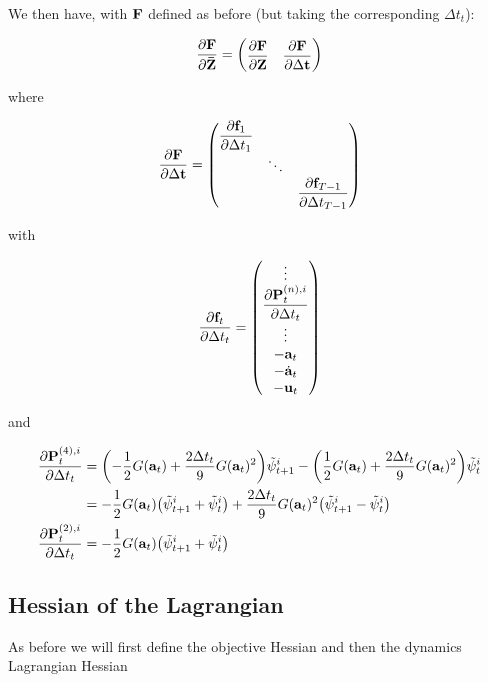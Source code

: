 \documentclass{article}
\newcommand{\isopsi}{\tilde \psi}
\begin{document}
We then have, with $\vb{F}$ defined as before (but taking the corresponding $\Delta t_t$):

\begin{equation}
  \pdv{\vb{F}}{\vb{\bar Z}} = \mqty(
    \displaystyle \pdv{\vb{F}}{\vb{Z}} &  
    \displaystyle \pdv{\vb{F}}{\Delta \vb{t}}
  )
\end{equation}

where 

\begin{equation}
  \pdv{\vb{F}}{\Delta \vb{t}} = \mqty(
    \displaystyle \pdv{\vb{f}_1}{\Delta t_1} \\
    & \ddots \\
    & & \displaystyle \pdv{\vb{f}_{T-1}}{\Delta t_{T-1}}
  )
\end{equation}

with

\begin{equation}
  \pdv{\vb{f}_t}{\Delta t_t} = 
  \mqty(
    \vdots \\
    \displaystyle \pdv{\vb{P}^{(n),i}_t}{\Delta t_t} \\
    \vdots \\
    -\vb{a}_t \\
    - \dot{\vb{a}}_t \\
    - \vb{u}_t \\
  )
\end{equation}

and

\begin{align}
  \pdv{\vb{P}^{(4),i}_t}{\Delta t_t} 
  &= \qty( -\frac{1}{2} G(\vb{a}_t) + \frac{2 \Delta t_t}{9} G(\vb{a}_t)^2) \isopsi^i_{t+1}
  - \qty(\frac{1}{2} G(\vb{a}_t) + \frac{2\Delta t_t}{9} G(\vb{a}_t)^2) \isopsi^i_t \nonumber\\
  &= -\frac{1}{2} G(\vb{a}_t) \qty(\isopsi^i_{t+1} + \isopsi^i_t) + \frac{2\Delta t_t}{9} G(\vb{a}_t)^2 \qty(\isopsi^i_{t+1} - \isopsi^i_t) \\
  \pdv{\vb{P}^{(2),i}_t}{\Delta t_t} 
  &=  -\frac{1}{2} G(\vb{a}_t) \qty(\isopsi^i_{t+1} + \isopsi^i_t)
\end{align}

\newpage

\subsection{Hessian of the Lagrangian}

As before we will first define the objective Hessian and then the dynamics Lagrangian Hessian
\end{document}
